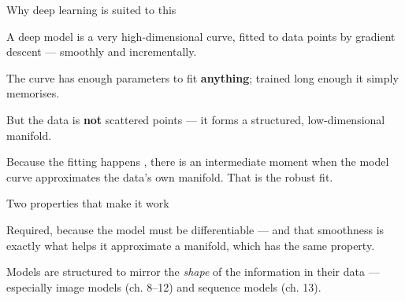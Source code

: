 \documentclass[aspectratio=169,11pt,t]{beamer}
\begin{document}
\begin{frame}[shrink=25]{Why deep learning is suited to this}
{\fontsize{9.4}{12.6}\selectfont\color{fg2}A deep model is a very high-dimensional curve, fitted to data points by gradient descent --- smoothly and incrementally.\par}\vskip 4pt
\begin{isteps}
\item The curve has enough parameters to fit \textbf{anything}; trained long enough it simply memorises.
\item But the data is \textbf{not} scattered points --- it forms a structured, low-dimensional manifold.
\item Because the fitting happens , there is an intermediate moment when the model curve approximates the data's own manifold. That is the robust fit.
\end{isteps}
\end{frame}

\begin{frame}[shrink=25]{Two properties that make it work}
\begin{minipage}[t]{0.494\textwidth}
\begin{icardgood}
Required, because the model must be differentiable --- and that smoothness is exactly what helps it approximate a manifold, which has the same property.
\end{icardgood}
\end{minipage}%
\hfill
\begin{minipage}[t]{0.494\textwidth}
\begin{icardgood}
Models are structured to mirror the \textit{shape} of the information in their data --- especially image models (ch. 8--12) and sequence models (ch. 13).
\end{icardgood}
\end{minipage}%
\end{frame}
\end{document}
